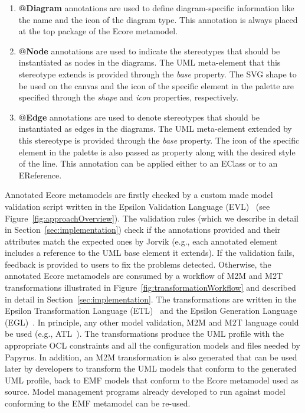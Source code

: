 \begin{enumerate}[label=\arabic*.]
	\item \textbf{@Diagram} annotations are used to define diagram-specific 
	information like the name and the icon of the diagram type. This annotation 
	is always placed at the top package of the Ecore metamodel.
	\item \textbf{@Node} annotations are used to indicate the stereotypes that 
	should be instantiated as nodes in the diagrams. The UML meta-element that 
	this stereotype extends is provided through the \emph{base} property. The 
	SVG shape to be used on the canvas and the icon of the specific element in 
	the palette are specified through the \emph{shape} and \emph{icon} 
	properties, respectively.
	\item \textbf{@Edge} annotations are used to denote stereotypes that should be instantiated as edges in the diagrams. The UML meta-element extended by this stereotype is provided through the \emph{base} property. The icon of the specific element in the palette is also passed as property along with the desired style of the line. This annotation can be applied either to an EClass or to an EReference.
\end{enumerate}

Annotated Ecore metamodels are firstly checked by a custom made model validation script written in the Epsilon Validation Language (EVL)~\cite{evlKolovos} (see Figure~\ref{fig:approachOverview}). The validation rules (which we describe in detail in Section~\ref{sec:implementation}) check if the annotations provided and their attributes match the expected ones by Jorvik (e.g., each annotated element includes a reference to the UML base element it extends). If the validation fails, feedback is provided to users to fix the problems detected. 
Otherwise, the annotated Ecore metamodels are consumed by a workflow of M2M and M2T 
transformations illustrated in Figure~\ref{fig:transformationWorkflow} and 
described in detail in Section~\ref{sec:implementation}. The transformations 
are written in the Epsilon Transformation Language (ETL)~\cite{Kolovos2008} and 
the Epsilon Generation Language (EGL)~\cite{rose2008egl}. In principle, any 
other model validation, M2M and M2T language could be used (e.g., ATL~\cite{jouault2006atl}). The 
transformations produce the UML 
profile with the appropriate OCL constraints and all the configuration models 
and files needed by Papyrus. In addition, an M2M transformation is also generated that can be used 
later by developers to transform the UML models that conform to the generated 
UML profile, back to EMF models that conform to the Ecore metamodel used as 
source. Model management programs already developed to run against model 
conforming to the EMF metamodel can be re-used.

